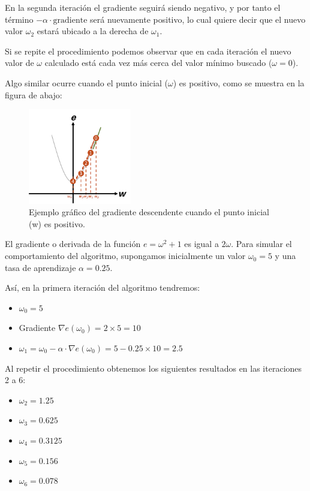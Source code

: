 \documentclass[conference]{IEEEtran}
\begin{document}
En la segunda iteración el gradiente seguirá siendo negativo, y por tanto el término $-\alpha \cdot \text{gradiente}$ será nuevamente positivo, lo cual quiere decir que el nuevo valor $\omega_2$ estará ubicado a la derecha de $\omega_1$.

Si se repite el procedimiento podemos observar que en cada iteración el nuevo valor de $\omega$ calculado está cada vez más cerca del valor mínimo buscado ($\omega = 0$).

Algo similar ocurre cuando el punto inicial ($\omega$) es positivo, como se muestra en la figura de abajo:

\begin{figure}[htbp]
\centering
\includegraphics[width=0.4\textwidth]{ej2.png}
\caption{Ejemplo gráfico del gradiente descendente cuando el punto inicial (w) es positivo.}
\label{fig:ejemplo}
\end{figure}

El gradiente o derivada de la función \( e = \omega^2 + 1 \) es igual a \( 2\omega \). Para simular el comportamiento del algoritmo, supongamos inicialmente un valor \( \omega_0 = 5 \) y una tasa de aprendizaje \( \alpha = 0.25 \).

Así, en la primera iteración del algoritmo tendremos:

\begin{itemize}
    \item \( \omega_0 = 5 \)
    \item Gradiente \( \nabla e(\omega_0) = 2 \times 5 = 10 \)
    \item \( \omega_1 = \omega_0 - \alpha \cdot \nabla e(\omega_0) = 5 - 0.25 \times 10 = 2.5 \)
\end{itemize}

Al repetir el procedimiento obtenemos los siguientes resultados en las iteraciones 2 a 6:

\begin{itemize}
    \item \( \omega_2 = 1.25 \)
    \item \( \omega_3 = 0.625 \)
    \item \( \omega_4 = 0.3125 \)
    \item \( \omega_5 = 0.156 \)
    \item \( \omega_6 = 0.078 \)
\end{itemize}
\end{document}
